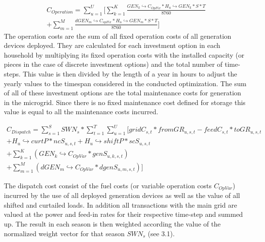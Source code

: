 \documentclass[
	11pt,								%
	DIV10,								%
	a4paper,         					%
	oneside,							%
	headheight=20pt,					%
	footheight=20pt,					%
    parskip=full,						%
    listof=totoc,						%
	bibliography=totoc,					%
	index=totoc,						%
]{scrartcl}
\begin{document}
\begin{equation}
	\begin{split}
		C_{Operation} = \sum_{u=1}^{U}[\sum_{k=1}^{K}\frac{GEN_k\hookrightarrow  C_{OpFix} * H_u \hookrightarrow GEN_k * S * T}{8760}\\
	 	+ \sum_{m=1}^{M}\frac{dGEN_m\hookrightarrow  C_{opFix} * H_u \hookrightarrow GEN_m * S * T}{8760}]
	\end{split}
\end{equation}
The operation costs are the sum of all fixed operation costs of all generation devices deployed. They are calculated for each investment option in each household by multiplying its fixed operation costs with the installed capacity (or pieces in the case of discrete investment options) and the total number of time-steps. This value is then divided by the length of a year in hours to adjust the yearly values to the timespan considered in the conducted optimization. The sum of all of these investment options are the total maintenance costs for generation in the microgrid. Since there is no fixed maintenance cost defined for storage this value is equal to all the maintenance costs incurred.

\begin{equation}
	\begin{split}
		C_{Dispatch} = \sum_{s=1}^{S} SWN_s * \sum_{t=1}^{T}\sum_{u=1}^{U}[gridC_{s,t} * fromGR_{u,s,t} - feedC_{s,t} * toGR_{u,s,t}\\
		+ H_u\hookrightarrow  curtP * ncS_{u,s,t} + H_u\hookrightarrow  shiftP * scS_{u,s,t}\\
		+ \sum_{k=1}^K(GEN_k\hookrightarrow  C_{OpVar} * genS_{u,k,s,t})\\ 
		+ \sum_{m=1}^M(dGEN_m\hookrightarrow  C_{OpVar} * dgenS_{u,m,s,t})]
	\end{split}
\end{equation}

The dispatch cost consist of the fuel costs (or variable operation costs $C_{OpVar}$) incurred by the use of all deployed generation devices as well as the value of all shifted and curtailed loads. In addition all transactions with the main grid are valued at the power and feed-in rates for their respective time-step and summed up. The result in each season is then weighted according the value of the normalized weight vector for that season $SWN_s$ (see 3.1).




\newpage
{}	
\end{document}
